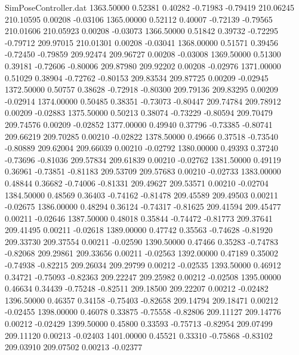 \begin{filecontents}{SimPoseController.dat}
1363.50000    0.52381    0.40282    -0.71983   -0.79419  210.06245  210.10595    0.00208   -0.03106
1365.00000    0.52112    0.40007    -0.72139   -0.79565  210.01606  210.05923    0.00208   -0.03073
1366.50000    0.51842    0.39732    -0.72295   -0.79712  209.97015  210.01301    0.00208   -0.03041
1368.00000    0.51571    0.39456    -0.72450   -0.79859  209.92474  209.96727    0.00208   -0.03008
1369.50000    0.51300    0.39181    -0.72606   -0.80006  209.87980  209.92202    0.00208   -0.02976
1371.00000    0.51029    0.38904    -0.72762   -0.80153  209.83534  209.87725    0.00209   -0.02945
1372.50000    0.50757    0.38628    -0.72918   -0.80300  209.79136  209.83295    0.00209   -0.02914
1374.00000    0.50485    0.38351    -0.73073   -0.80447  209.74784  209.78912    0.00209   -0.02883
1375.50000    0.50213    0.38074    -0.73229   -0.80594  209.70479  209.74576    0.00209   -0.02852
1377.00000    0.49940    0.37796    -0.73385   -0.80741  209.66219  209.70285    0.00210   -0.02822
1378.50000    0.49666    0.37518    -0.73540   -0.80889  209.62004  209.66039    0.00210   -0.02792
1380.00000    0.49393    0.37240    -0.73696   -0.81036  209.57834  209.61839    0.00210   -0.02762
1381.50000    0.49119    0.36961    -0.73851   -0.81183  209.53709  209.57683    0.00210   -0.02733
1383.00000    0.48844    0.36682    -0.74006   -0.81331  209.49627  209.53571    0.00210   -0.02704
1384.50000    0.48569    0.36403    -0.74162   -0.81478  209.45589  209.49503    0.00211   -0.02675
1386.00000    0.48294    0.36124    -0.74317   -0.81625  209.41594  209.45477    0.00211   -0.02646
1387.50000    0.48018    0.35844    -0.74472   -0.81773  209.37641  209.41495    0.00211   -0.02618
1389.00000    0.47742    0.35563    -0.74628   -0.81920  209.33730  209.37554    0.00211   -0.02590
1390.50000    0.47466    0.35283    -0.74783   -0.82068  209.29861  209.33656    0.00211   -0.02563
1392.00000    0.47189    0.35002    -0.74938   -0.82215  209.26034  209.29799    0.00212   -0.02535
1393.50000    0.46912    0.34721    -0.75093   -0.82363  209.22247  209.25982    0.00212   -0.02508
1395.00000    0.46634    0.34439    -0.75248   -0.82511  209.18500  209.22207    0.00212   -0.02482
1396.50000    0.46357    0.34158    -0.75403   -0.82658  209.14794  209.18471    0.00212   -0.02455
1398.00000    0.46078    0.33875    -0.75558   -0.82806  209.11127  209.14776    0.00212   -0.02429
1399.50000    0.45800    0.33593    -0.75713   -0.82954  209.07499  209.11120    0.00213   -0.02403
1401.00000    0.45521    0.33310    -0.75868   -0.83102  209.03910  209.07502    0.00213   -0.02377

\end{filecontents}
